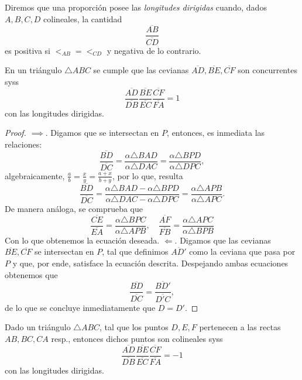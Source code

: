 \documentclass[11pt,a4paper]{book}
\begin{document}
Diremos que una proporción posee las \textit{longitudes dirigidas} cuando, dados $A,B,C,D$ colineales, la cantidad
$$\frac{\overline{AB}}{\overline{CD}}$$
es positiva si $ {<_{AB}} = {<_{CD}} $ y negativa de lo contrario.
\begin{thm}
	En un triángulo $\triangle ABC$ se cumple que las cevianas $\overline{AD}, \overline{BE}, \overline{CF}$ son concurrentes syss
	$$\frac{\overline{AD}}{\overline{DB}} \frac{\overline{BE}}{\overline{EC}} \frac{\overline{CF}}{\overline{FA}}=1$$
	con las longitudes dirigidas.
\end{thm}
\begin{proof}
$\implies$. Digamos que se intersectan en $P$, entonces, es inmediata las relaciones:
	$$\frac{\overline{BD}}{\overline{DC}}=\frac{\alpha\triangle BAD}{\alpha\triangle DAC}=\frac{\alpha\triangle BPD}{\alpha\triangle DPC},$$
	algebraicamente, $\frac{a}{b}=\frac{x}{y}=\frac{a+x}{b+y}$, por lo que, resulta
	$$\frac{\overline{BD}}{\overline{DC}}=\frac{\alpha\triangle BAD-\alpha\triangle BPD}{\alpha\triangle DAC-\alpha\triangle DPC}=\frac{\alpha\triangle APB}{\alpha\triangle APC}.$$
	De manera análoga, se comprueba que
	$$\frac{\overline{CE}}{\overline{EA}}=\frac{\alpha\triangle BPC}{\alpha\triangle APB},\quad\frac{\overline{AF}}{\overline{FB}}=\frac{\alpha\triangle APC}{\alpha\triangle BPB}$$
	Con lo que obtenemos la ecuación deseada.
$\Longleftarrow$. Digamos que las cevianas $\overline{BE}, \overline{CF}$ se intersectan en $P$, tal que definimos $ \overline{AD'} $ como la ceviana que pasa por $P$ y que, por ende, satisface la ecuación descrita. Despejando ambas ecuaciones obtenemos que
	$$\frac{\overline{BD}}{\overline{DC}}=\frac{\overline{BD'}}{\overline{D'C}},$$
	de lo que se concluye inmediatamente que $D=D'$.
\end{proof}
\begin{thm}
	Dado un triángulo $\triangle ABC$, tal que los puntos $D,E,F$ pertenecen a las rectas $AB,BC,CA$ resp., entonces dichos puntos son colineales syss
	$$\frac{\overline{AD}}{\overline{DB}} \frac{\overline{BE}}{\overline{EC}} \frac{\overline{CF}}{\overline{FA}}=-1$$
	con las longitudes dirigidas.
\end{thm}
\end{document}
